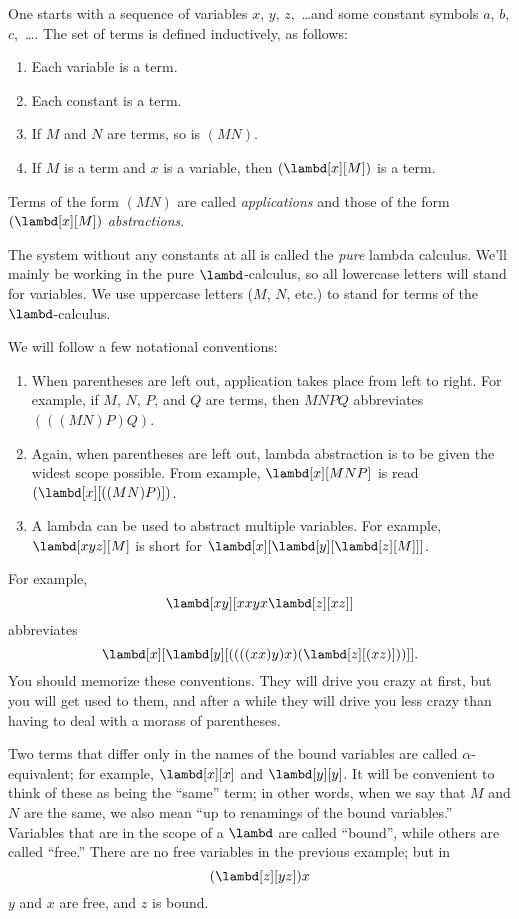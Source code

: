 \documentclass[../../../include/open-logic-section]{subfiles}
\begin{document}

One starts with a sequence of variables $x$, $y$, $z$,~\dots and some
constant symbols $a$, $b$, $c$,~\dots. The set of terms is defined
inductively, as follows:
\begin{enumerate}
\item Each variable is a term.
\item Each constant is a term.
\item If $M$ and $N$ are terms, so is $(MN)$.
\item If $M$ is a term and $x$ is a variable, then $(\lambd[x][M])$ is a
  term.
\end{enumerate}
Terms of the form $(MN)$ are called \emph{applications} and those of
the form $(\lambd[x][M])$ \emph{abstractions}.

The system without any constants at all is called the \emph{pure}
lambda calculus. We'll mainly be working in the pure
$\lambd$-calculus, so all lowercase letters will stand for variables.
We use uppercase letters ($M$, $N$, etc.) to stand for terms of the
$\lambd$-calculus.

We will follow a few notational conventions:

\begin{conv}
\begin{enumerate}
\item When parentheses are left out, application takes place from left
  to right. For example, if $M$, $N$, $P$, and $Q$ are terms, then
  $MNPQ$ abbreviates $(((MN)P)Q)$.
\item Again, when parentheses are left out, lambda abstraction is to
  be given the widest scope possible. From example, $\lambd[x][MNP]$ is
  read $(\lambd[x][((MN)P)])$.
\item A lambda can be used to abstract multiple variables. For
  example, $\lambd[xyz][M]$ is short for
  $\lambd[x][\lambd[y][\lambd[z][M]]]$.
\end{enumerate}
\end{conv}

For example,
\[
\lambd[xy][xxyx \lambd[z][xz]]
\]
abbreviates
\[
\lambd[x][\lambd[y][((((xx)y)x)(\lambd[z][(xz)]))]].
\]
You should memorize these conventions. They will drive you crazy at
first, but you will get used to them, and after a while they will
drive you less crazy than having to deal with a morass of parentheses.

Two terms that differ only in the names of the bound variables are
called $\alpha$-equivalent; for example, $\lambd[x][x]$ and
$\lambd[y][y]$. It will be convenient to think of these as being the
``same'' term; in other words, when we say that $M$ and $N$ are the
same, we also mean ``up to renamings of the bound variables.''
Variables that are in the scope of a $\lambd$ are called ``bound'',
while others are called ``free.'' There are no free variables in the
previous example; but in
\[
(\lambd[z][yz])x
\]
$y$ and $x$ are free, and $z$ is bound.
\end{document}

